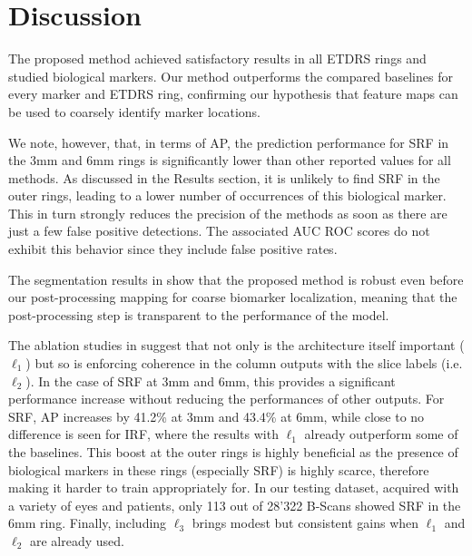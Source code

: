 \section{Discussion}

The proposed method achieved satisfactory results in all ETDRS rings and studied biological markers. Our method outperforms the compared baselines for every marker and ETDRS ring, confirming our hypothesis that feature maps can be used to coarsely identify marker locations.

We note, however, that, in terms of AP, the prediction performance for SRF in the 3mm and 6mm rings is significantly lower than other reported values for all methods. As discussed in the Results section, it is unlikely to find SRF in the outer rings, leading to a lower number of occurrences of this biological marker. This in turn strongly reduces the precision of the methods as soon as there are just a few false positive detections. The associated AUC ROC scores do not exhibit this behavior since they include false positive rates.

The segmentation results in  show that the proposed method is robust even before our post-processing mapping for coarse biomarker localization, meaning that the post-processing step is transparent to the performance of the model. 

The ablation studies in  suggest that not only is the architecture itself important ($\ell_1$) but so is enforcing coherence in the column outputs with the slice labels (i.e. $\ell_2$). In the case of SRF at 3mm and 6mm, this provides a significant performance increase without reducing the performances of other outputs. For SRF, AP increases by 41.2\% at 3mm and 43.4\% at 6mm, while close to no difference is seen for IRF, where the results with $\ell_1$ already outperform some of the baselines. This boost at the outer rings is highly beneficial as the presence of biological markers in these rings (especially SRF) is highly scarce, therefore making it harder to train appropriately for. In our testing dataset, acquired with a variety of eyes and patients, only 113 out of 28’322 B-Scans showed SRF in the 6mm ring. Finally, including $\ell_3$ brings modest but consistent gains when $\ell_1$ and $\ell_2$ are already used.

